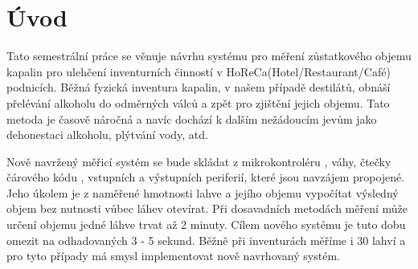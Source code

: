 \chapter*{Úvod}
{}

Tato semestrální práce se věnuje návrhu systému pro měření zůstatkového objemu kapalin pro ulehčení inventurních činností v HoReCa(Hotel/Restaurant/Café) podnicích. Běžná fyzická inventura kapalin, v našem případě destilátů, obnáší přelévání alkoholu do odměrných válců a zpět pro zjištění jejich objemu. Tato metoda je časově náročná a navíc dochází k dalším nežádoucím jevům jako dehonestaci alkoholu, plýtvání vody, atd.

Nově navržený měřicí systém se bude skládat z mikrokontroléru \cite{Raspberry pi}, váhy, čtečky čárového kódu \cite{Sensor for robots}, vstupních a výstupních periferií, které jsou navzájem propojené. Jeho úkolem je z naměřené hmotnosti lahve a jejího objemu vypočítat výsledný objem bez nutnosti vůbec láhev otevírat.
Při dosavadních metodách měření může určení objemu jedné láhve trvat až 2 minuty. Cílem nového systému je tuto dobu omezit na odhadovaných 3 - 5 sekund. Běžně při inventurách měříme i 30 lahví a pro tyto případy má smysl implementovat nově navrhovaný systém.







































%
%
%

